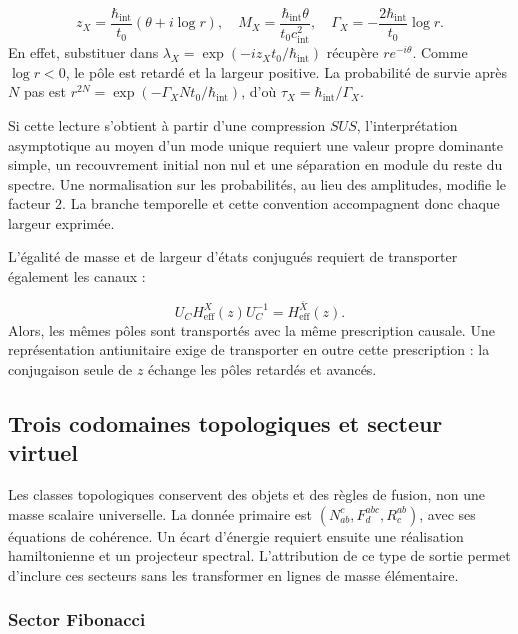 \begin{equation}
 z_X=\frac{\hbar_{\mathrm{int}}}{t_0}
 (\theta+i\log r),\quad
 M_X=\frac{\hbar_{\mathrm{int}}\theta}{t_0c_{\mathrm{int}}^2},\quad
 \Gamma_X=-\frac{2\hbar_{\mathrm{int}}}{t_0}\log r.
 \label{vi:eq:anchura-discreta-familias}
\end{equation}
En effet, substituer dans
\(\lambda_X=\exp(-iz_Xt_0/\hbar_{\mathrm{int}})\) récupère
\(re^{-i\theta}\). Comme \(\log r<0\), le pôle est retardé et la
largeur positive. La probabilité de survie après \(N\) pas est
\(r^{2N}=\exp(-\Gamma_XNt_0/\hbar_{\mathrm{int}})\), d’où
\(\tau_X=\hbar_{\mathrm{int}}/\Gamma_X\).


Si cette lecture s’obtient à partir d’une compression \(SUS\), l’interprétation
asymptotique au moyen d’un mode unique requiert une valeur propre dominante
simple, un recouvrement initial non nul et une séparation en module du reste
du spectre. Une normalisation sur les probabilités, au lieu des
amplitudes, modifie le facteur \(2\). La branche temporelle et cette convention
accompagnent donc chaque largeur exprimée.


L’égalité de masse et de largeur d’états conjugués requiert de transporter
également les canaux :

\[
 U_C H_{\mathrm{eff}}^X(z)U_C^{-1}=H_{\mathrm{eff}}^{\bar X}(z).
\]
Alors, les mêmes pôles sont transportés avec la même prescription
causale. Une représentation antiunitaire exige de transporter en outre cette
prescription : la conjugaison seule de \(z\) échange les pôles
retardés et avancés.


\subsection{Trois codomaines topologiques et secteur virtuel
}
\label{vi:subsec:topologicos-familias}

Les classes topologiques conservent des objets et des règles de fusion, non une
masse scalaire universelle. La donnée primaire est
\((N_{ab}^{c},F^{abc}_d,R^{ab}_c)\), avec ses équations de cohérence.
Un écart d’énergie requiert ensuite une réalisation hamiltonienne et
un projecteur spectral. L’attribution de ce type de sortie permet
d’inclure ces secteurs sans les transformer en lignes de masse élémentaire.


\subsubsection{Sector Fibonacci}

